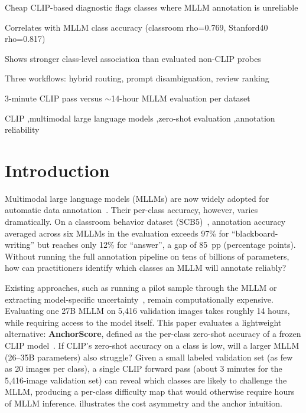 \documentclass[a4paper,fleqn]{cas-sc}
\begin{document}
\begin{highlights}
\item Cheap CLIP-based diagnostic flags classes where MLLM annotation is unreliable
\item Correlates with MLLM class accuracy (classroom rho=0.769, Stanford40 rho=0.817)
\item Shows stronger class-level association than evaluated non-CLIP probes
\item Three workflows: hybrid routing, prompt disambiguation, review ranking
\item 3-minute CLIP pass versus $\sim$14-hour MLLM evaluation per dataset
\end{highlights}

\begin{keywords}
CLIP \sep multimodal large language models \sep zero-shot evaluation \sep annotation reliability
\end{keywords}

\maketitle

\section{Introduction}
\label{sec:intro}

Multimodal large language models (MLLMs) are now widely adopted for automatic data annotation~\cite{liu2023visual}. Their per-class accuracy, however, varies dramatically. On a classroom behavior dataset (SCB5)~\cite{ma2026agreement}, annotation accuracy averaged across six MLLMs in the evaluation exceeds 97\% for ``blackboard-writing'' but reaches only 12\% for ``answer'', a gap of 85~pp (percentage points). Without running the full annotation pipeline on tens of billions of parameters, how can practitioners identify which classes an MLLM will annotate reliably?

Existing approaches, such as running a pilot sample through the MLLM or extracting model-specific uncertainty~\cite{kadavath2022language}, remain computationally expensive. Evaluating one 27B MLLM on 5{,}416 validation images takes roughly 14 hours, while requiring access to the model itself. This paper evaluates a lightweight alternative: \textbf{AnchorScore}, defined as the per-class zero-shot accuracy of a frozen CLIP model~\cite{radford2021clip}. If CLIP's zero-shot accuracy on a class is low, will a larger MLLM (26--35B parameters) also struggle? Given a small labeled validation set (as few as 20 images per class), a single CLIP forward pass (about 3 minutes for the 5{,}416-image validation set) can reveal which classes are likely to challenge the MLLM, producing a per-class difficulty map that would otherwise require hours of MLLM inference.  illustrates the cost asymmetry and the anchor intuition.
\end{document}
